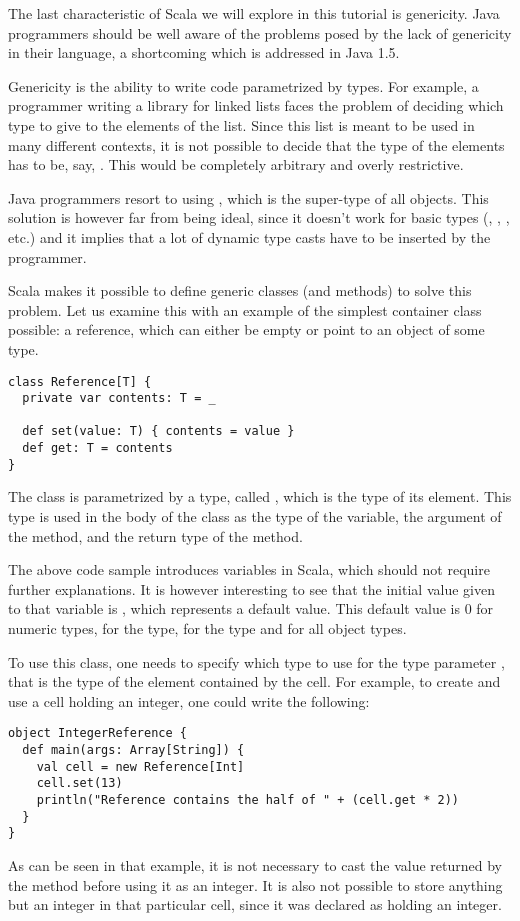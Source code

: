 \documentclass[a4paper,12pt,twoside,titlepage]{article}
\newcommand{\langname}[1]{#1\xspace}
\newcommand{\Scala}{\langname{Scala}}
\newcommand{\Java}{\langname{Java}}
\begin{document}
The last characteristic of \Scala we will explore in this tutorial is
genericity. \Java programmers should be well aware of the problems
posed by the lack of genericity in their language, a shortcoming which
is addressed in \Java 1.5.

Genericity is the ability to write code parametrized by types. For
example, a programmer writing a library for linked lists faces the
problem of deciding which type to give to the elements of the list.
Since this list is meant to be used in many different contexts, it is
not possible to decide that the type of the elements has to be, say,
. This would be completely arbitrary and overly
restrictive.

\Java programmers resort to using , which is the
super-type of all objects. This solution is however far from being
ideal, since it doesn't work for basic types (,
, , etc.) and it implies that a lot of
dynamic type casts have to be inserted by the programmer.

\Scala makes it possible to define generic classes (and methods) to
solve this problem. Let us examine this with an example of the
simplest container class possible: a reference, which can either be
empty or point to an object of some type.
\begin{lstlisting}
class Reference[T] {
  private var contents: T = _

  def set(value: T) { contents = value }
  def get: T = contents
}
\end{lstlisting}
The class  is parametrized by a type, called ,
which is the type of its element. This type is used in the body of the
class as the type of the  variable, the argument of
the  method, and the return type of the  method.

The above code sample introduces variables in \Scala, which should not
require further explanations. It is however interesting to see that
the initial value given to that variable is \code{_}, which represents
a default value. This default value is 0 for numeric types,
 for the  type, \code{()} for the 
type and  for all object types.

To use this  class, one needs to specify which type to use
for the type parameter , that is the type of the element
contained by the cell. For example, to create and use a cell holding
an integer, one could write the following:
\begin{lstlisting}
object IntegerReference {
  def main(args: Array[String]) {
    val cell = new Reference[Int]
    cell.set(13)
    println("Reference contains the half of " + (cell.get * 2))
  }
}
\end{lstlisting}
As can be seen in that example, it is not necessary to cast the value
returned by the  method before using it as an integer. It
is also not possible to store anything but an integer in that
particular cell, since it was declared as holding an integer.
\end{document}
